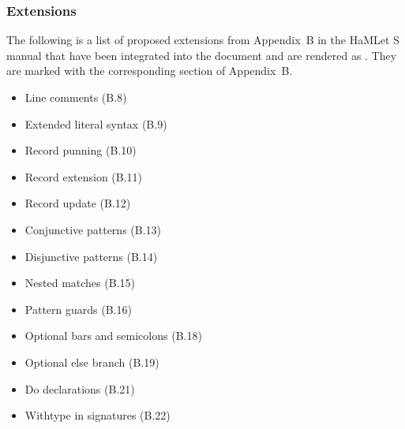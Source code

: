 \subsubsection{Extensions}
The following is a list of proposed extensions from Appendix~B in the HaMLet S manual
that have been integrated into the document and are rendered as .
They are marked with the corresponding section of Appendix~B.
\begin{itemize}
\setlength{\itemsep}{0em}
\item Line comments (B.8)
\item Extended literal syntax (B.9)
\item Record punning (B.10)
\item Record extension (B.11)
\item Record update (B.12)
\item Conjunctive patterns (B.13)
\item Disjunctive patterns (B.14)
\item Nested matches (B.15)
\item Pattern guards (B.16)
\item Optional bars and semicolons (B.18)
\item Optional else branch (B.19)
\item Do declarations (B.21)
\item Withtype in signatures (B.22)
\end{itemize}

